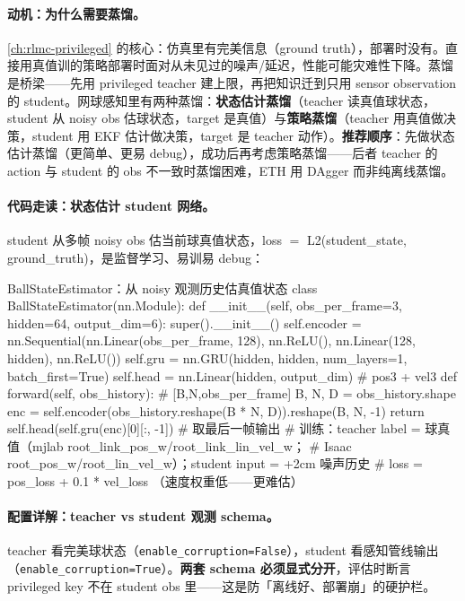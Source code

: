 \paragraph{动机：为什么需要蒸馏。}\cref{ch:rlmc-privileged} 的核心：仿真里有完美信息（ground truth），部署时没有。直接用真值训的策略部署时面对从未见过的噪声/延迟，性能可能灾难性下降。蒸馏是桥梁——先用 privileged teacher 建上限，再把知识迁到只用 sensor observation 的 student。网球感知里有两种蒸馏：\textbf{状态估计蒸馏}（teacher 读真值球状态，student 从 noisy obs 估球状态，target 是真值）与\textbf{策略蒸馏}（teacher 用真值做决策，student 用 EKF 估计做决策，target 是 teacher 动作）。\textbf{推荐顺序}：先做状态估计蒸馏（更简单、更易 debug），成功后再考虑策略蒸馏——后者 teacher 的 action 与 student 的 obs 不一致时蒸馏困难，ETH 用 DAgger 而非纯离线蒸馏\cite{tennis_eth2025badminton}。

\paragraph{代码走读：状态估计 student 网络。}student 从多帧 noisy obs 估当前球真值状态，loss $=$ L2(student\_state, ground\_truth)，是监督学习、易训易 debug：

\begin{codebox}[Python]{BallStateEstimator：从 noisy 观测历史估真值状态}
class BallStateEstimator(nn.Module):
    def __init__(self, obs_per_frame=3, hidden=64, output_dim=6):
        super().__init__()
        self.encoder = nn.Sequential(nn.Linear(obs_per_frame, 128), nn.ReLU(),
                                     nn.Linear(128, hidden), nn.ReLU())
        self.gru = nn.GRU(hidden, hidden, num_layers=1, batch_first=True)
        self.head = nn.Linear(hidden, output_dim)            # pos3 + vel3
    def forward(self, obs_history):                          # [B,N,obs_per_frame]
        B, N, D = obs_history.shape
        enc = self.encoder(obs_history.reshape(B * N, D)).reshape(B, N, -1)
        return self.head(self.gru(enc)[0][:, -1])            # 取最后一帧输出
# 训练：teacher label = 球真值（mjlab root_link_pos_w/root_link_lin_vel_w；
#       Isaac root_pos_w/root_lin_vel_w）；student input = +2cm 噪声历史
# loss = pos_loss + 0.1 * vel_loss   （速度权重低——更难估）
\end{codebox}

\paragraph{配置详解：teacher vs student 观测 schema。}teacher 看完美球状态（\verb|enable_corruption=False|），student 看感知管线输出（\verb|enable_corruption=True|）。\textbf{两套 schema 必须显式分开}，评估时断言 privileged key 不在 student obs 里——这是防「离线好、部署崩」的硬护栏。

